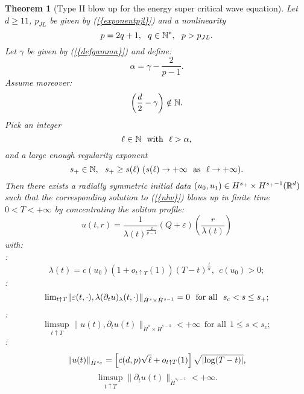 \documentclass[11pt,a4paper,reqno]{amsart}
\newtheorem{theorem}{Theorem}[section]
\theoremstyle{remark}
\numberwithin{equation}{section}
\begin{document}
\begin{theorem}[Type II blow up for the energy super critical wave equation]
\label{thmmain}
Let $d\geq 11$, $p_{JL}$ be given by {{\rm (\ref{{exponentpjl}})}} and a nonlinearity 
\begin{equation}
\label{plarge}  p=2q+1,\ \ q\in \Bbb N^*,\ \ p> p_{JL}.
\end{equation} 
Let $\gamma$ be given by {{\rm (\ref{{defgamma}})}} and define:
\begin{equation} \label{intro:eq:def alpha}
\alpha=\gamma-\frac{2}{p-1}.
\end{equation}
Assume moreover:
\begin{equation}
\label{conditiongamma}
\left(\frac d2-\gamma\right)\notin \Bbb N.
\end{equation}
Pick an integer 
\begin{equation}
\label{codnionrionfeell}
 \ell\in \Bbb N \ \ \mbox{with}\ \ \ell>\alpha,
 \end{equation}
 and a large enough regularity exponent 
$$s_+\in \Bbb N, \ \ s_+\geq s(\ell) \ (s(\ell) \to +\infty\ \ \mbox{as}\ \ \ell\to +\infty).$$ Then there exists a radially symmetric initial data $(u_0, u_1)\in H^{s_+}\times H^{s_+-1}(\Bbb R^d)$ such that the corresponding solution to {{\rm (\ref{{nlw}})}} blows up in finite time $0<T<+\infty$ by concentrating the soliton profile:
\begin{equation}
\label{concnenergy}
u(t,r)=\frac{1}{{\lambda}(t)^{\frac 2{p-1}}}(Q+{\varepsilon})\left(\frac{r}{{\lambda}(t)}\right)
\end{equation}
with:\\
: 
\begin{equation}
\label{Pexciitedlaw}
{\lambda}(t)=c(u_0)(1+o_{t\uparrow T}(1))(T-t)^{\frac{\ell}{\alpha}}, \ \ c(u_0)>0;
\end{equation}
: 
\begin{equation} 
\label{intro:eq:convergence surcritique}
{\mathop{\rm lim}}_{t\uparrow T}\|{\varepsilon}(t,\cdot),\lambda(\partial_t u)_{\lambda}(t,\cdot)\|_{\dot{H}^s\times \dot{H}^{s-1}}=0  \ \ \mbox{for all}\ \ s_c<s\leq s_+;
\end{equation}
:
\begin{equation}
\label{intro:eq:bornitude sous critique}
\limsup_{t\uparrow T}\|u(t),\partial_t u(t)\|_{\dot{H}^s\times \dot{H}^{s-1}}<+\infty  \ \ \mbox{for all}\ \ 1\leq s<s_c;
\end{equation}
:
\begin{equation}
\label{intro:eq:comportement norme critique}
\|u(t)\|_{\dot{H}^{s_c}}=\left[c(d,p)\sqrt{\ell}+o_{t\uparrow T}(1)\right]\sqrt{|{{\rm log}}(T-t)|},
\end{equation}
\begin{equation}
\label{intro:eq:comportement norme critique 2}
\limsup_{t\uparrow T} \|\partial_t u(t)\|_{\dot{H}^{s_c-1}}<+\infty.
\end{equation}
\end{theorem}
\end{document}
